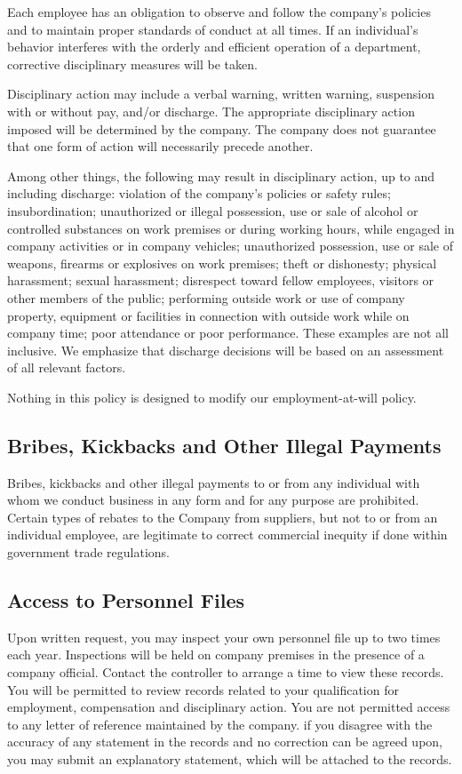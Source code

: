 Each employee has an obligation to observe and follow the company's policies and to maintain proper standards of conduct at all times. If an individual's behavior interferes with the orderly and efficient operation of a department, corrective disciplinary measures will be taken.

Disciplinary action may include a verbal warning, written warning, suspension with or without pay, and/or discharge. The appropriate disciplinary action imposed will be determined by the company. The company does not guarantee that one form of action will necessarily precede another.

Among other things, the following may result in disciplinary action, up to and including discharge: violation of the company's policies or safety rules; insubordination; unauthorized or illegal possession, use or sale of alcohol or controlled substances on work premises or during working hours, while engaged in company activities or in company vehicles; unauthorized possession, use or sale of weapons, firearms or explosives on work premises; theft or dishonesty; physical harassment; sexual harassment; disrespect toward fellow employees, visitors or other members of the public; performing outside work or use of company property, equipment or facilities in connection with outside work while on company time; poor attendance or poor performance. These examples are not all inclusive. We emphasize that discharge decisions will be based on an assessment of all relevant factors.

Nothing in this policy is designed to modify our employment-at-will policy.

\subsection{Bribes, Kickbacks and Other Illegal Payments}

Bribes, kickbacks and other illegal payments to or from any individual with whom we conduct business in any form and for any purpose are prohibited. Certain types of rebates to the Company from suppliers, but not to or from an individual employee, are legitimate to correct commercial inequity if done within government trade regulations.

\subsection{Access to Personnel Files}

Upon written request, you may inspect your own personnel file up to two times each year. Inspections will be held on company premises in the presence of a company official. Contact the controller to arrange a time to view these records. You will be permitted to review records related to your qualification for employment, compensation and disciplinary action. You are not permitted access to any letter of reference maintained by the company. if you disagree with the accuracy of any statement in the records and no correction can be agreed upon, you may submit an explanatory statement, which will be attached to the records.

